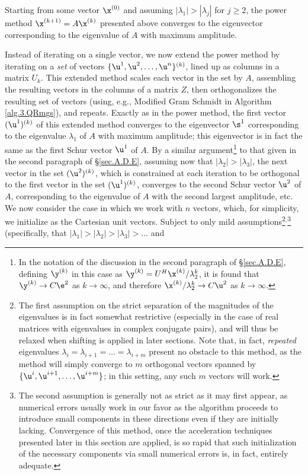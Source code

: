 \noindent Starting from some vector $\x^{(0)}$ and assuming $|\lambda_1|>|\lambda_j|$ for $j\ge 2$,
the power method $\x^{(k+1)}=A\x^{(k)}$ presented above converges to the eigenvector corresponding
to the eigenvalue of $A$ with maximum amplitude. 

Instead of iterating on a single vector, we now extend the power method by iterating on a {\it set} of vectors $\{\u^{1},\u^{2},\ldots,\u^{n}\}^{(k)}$,
lined up as columns in a matrix ${U_k}$.  This extended method scales each vector in the set by $A$, assembling the resulting vectors in the columns of
a matrix $Z$, then orthogonalizes the resulting set of vectors (using, e.g., Modified Gram Schmidt in Algorithm \ref{alg.3.QRmgs}), and repeats.  
Exactly as in the power method, the first vector $(\u^{1})^{(k)}$ of this extended method converges to the eigenvector $\s^1$
corresponding to the eigenvalue $\lambda_1$ of $A$ with
maximum amplitude; this eigenvector is in fact the same as the first Schur vector $\u^1$ of $A$.  By a similar argument\footnote{In the notation
of the discussion in the second paragraph of \S \ref{sec.A.D.E}, defining $\y^{(k)}$ in this case as $\y^{(k)}=U^H\x^{(k)}/\lambda^k_2$,
it is found that $\y^{(k)}\rightarrow C\e^2$ as $k\rightarrow\infty$, and therefore $\x^{(k)}/\lambda_2^k\rightarrow C\u^2$  as
$k\rightarrow\infty$.} to that given in the second paragraph of \S \ref{sec.A.D.E}, assuming now that $|\lambda_2|>|\lambda_3|$,
the next vector in the set $(\u^{2})^{(k)}$, which is constrained at each iteration to be orthogonal to the first vector in the set $(\u^{1})^{(k)}$,
converges to the second Schur vector $\u^2$ of $A$, corresponding to the eigenvalue of $A$ with the second largest amplitude, etc.
We now consider the case in which we work with $n$ vectors, which, for simplicity, we initialize as the Cartesian unit vectors.  
Subject to only mild assumptions\footnote{The first assumption on the strict separation of the magnitudes of the eigenvalues
is in fact somewhat restrictive (especially in the case of real matrices with eigenvalues in complex conjugate pairs),
and will thus be relaxed when shifting is applied in later sections.  Note that, in fact, {\it repeated} eigenvalues
$\lambda_i=\lambda_{i+1}=\ldots=\lambda_{i+m}$
present no obstacle to this method, as the method will simply converge to $m$ orthogonal vectors spanned by $\{\u^i,\u^{i+1},\ldots,\u^{i+m}\}$;
in this setting, any such $m$ vectors will work.}$^{,}$\footnote{The \label{footnoteC} second assumption is generally not as strict as it may first appear, as numerical errors
usually work in our favor as the algorithm proceeds to introduce
small components in these directions even if they are initially lacking.  Convergence of this method, once the acceleration techniques
presented later in this section are applied, is so rapid that such initialization of the necessary components
via small numerical errors is, in fact, entirely adequate.} (specifically, that $|\lambda_1|>|\lambda_2|>|\lambda_3|>\ldots$ and
